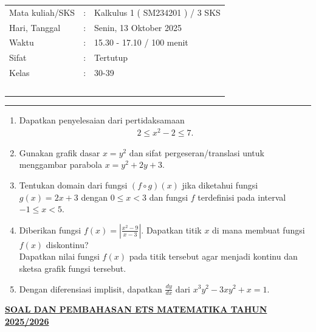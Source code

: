 \documentclass[10pt,openany,a4paper]{article}
\theoremstyle{definition}
\theoremstyle{definition}
\theoremstyle{plain}
\begin{document}
    \begin{center}
	\begin{tabular}{lcl}
		Mata kuliah/SKS & : & Kalkulus 1 ( SM234201 ) / 3 SKS\\
		Hari, Tanggal & : & Senin, 13 Oktober 2025\\
		Waktu & : & 15.30 - 17.10 / 100 menit\\
		Sifat & : & Tertutup\\
		Kelas & : & 30-39\\
  ~
	\end{tabular}
    
    \noindent\rule{\textwidth}{2.pt}
        \end{center}
        \begin{enumerate}
            \item Dapatkan penyelesaian dari pertidaksamaan 
            \begin{align*}
                2\leq x^2-2\leq 7.
            \end{align*}
            \item Gunakan grafik dasar $x=y^2$ dan sifat pergeseran/translasi untuk menggambar parabola $x=y^2+2y+3$.
            \item Tentukan domain dari fungsi $(f\circ g)(x)$ jika diketahui fungsi $g(x)=2x+3$ dengan $0\leq x<3$ dan fungsi $f$ terdefinisi pada interval $-1\leq x <5$.
            \item Diberikan fungsi $f(x)=\left|\frac{x^2-9}{x-3}\right|$. Dapatkan titik $x$ di mana membuat fungsi $f(x)$ diskontinu?\\
            Dapatkan nilai fungsi $f(x)$ pada titik tersebut agar menjadi kontinu dan sketsa grafik fungsi tersebut.
            \item Dengan diferensiasi implisit, dapatkan $\frac{dy}{dx}$ dari $x^3y^2-3xy^2+x=1$.
        \end{enumerate}
 \newpage
 \begin{center}
	{\underline{\textbf{\MakeUppercase{Soal dan Pembahasan ETS Matematika Tahun 2025/2026}}}}
    \end{center}
\end{document}
